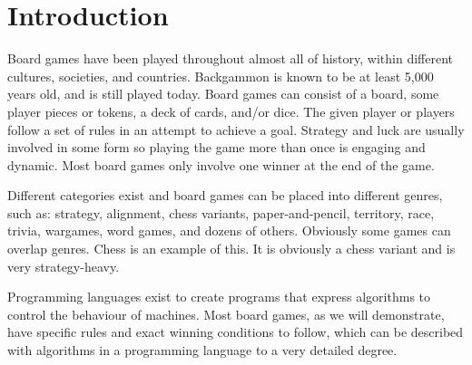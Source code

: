 \chapter{Introduction}
\label{chap:introduction}

Board games have been played throughout almost all of history, within different cultures, societies, and countries. Backgammon is known to be at least 5,000 years old, and is still played today. Board games can consist of a board, some player pieces or tokens, a  deck of cards, and/or dice. The given player or players follow a set of rules in an attempt to achieve a goal. Strategy and luck are usually involved in some form so playing the game more than once is engaging and dynamic. Most board games only involve one winner at the end of the game.

Different categories exist and board games can be  placed into different genres, such as: strategy, alignment, chess variants, paper-and-pencil, territory, race, trivia, wargames, word games, and dozens of others. Obviously some games can overlap genres. Chess is an example of this. It is obviously a chess variant and is very strategy-heavy.

Programming languages exist to create programs that express algorithms to control the behaviour of machines. Most board games, as we will demonstrate, have specific rules and exact winning conditions to follow, which can be described with algorithms in a programming language to a very detailed degree.



